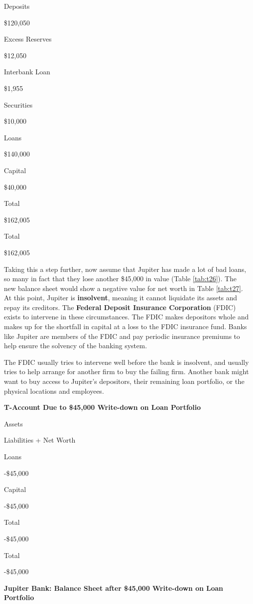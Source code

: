 \documentclass[
]{book}
\begin{document}
Deposits

\$120,050

Excess Reserves

\$12,050

Interbank Loan

\$1,955

Securities

\$10,000

Loans

\$140,000

Capital

\$40,000

Total

\$162,005

Total

\$162,005

Taking this a step further, now assume that Jupiter has made a lot of bad loans, so many in fact that they lose another \$45,000 in value (Table \ref{tab:t26}). The new balance sheet would show a negative value for net worth in Table \ref{tab:t27}. At this point, Jupiter is \textbf{insolvent}, meaning it cannot liquidate its assets and repay its creditors. The \textbf{Federal Deposit Insurance Corporation} (FDIC) exists to intervene in these circumstances. The FDIC makes depositors whole and makes up for the shortfall in capital at a loss to the FDIC insurance fund. Banks like Jupiter are members of the FDIC and pay periodic insurance premiums to help ensure the solvency of the banking system.

The FDIC usually tries to intervene well before the bank is insolvent, and usually tries to help arrange for another firm to buy the failing firm. Another bank might want to buy access to Jupiter's depositors, their remaining loan portfolio, or the physical locations and employees.

\label{tab:t26}\textbf{T-Account Due to \$45,000 Write-down on Loan Portfolio}

Assets

Liabilities + Net Worth

Loans

-\$45,000

Capital

-\$45,000

Total

-\$45,000

Total

-\$45,000

\label{tab:t27}\textbf{Jupiter Bank: Balance Sheet after \$45,000 Write-down on Loan Portfolio}
\end{document}
